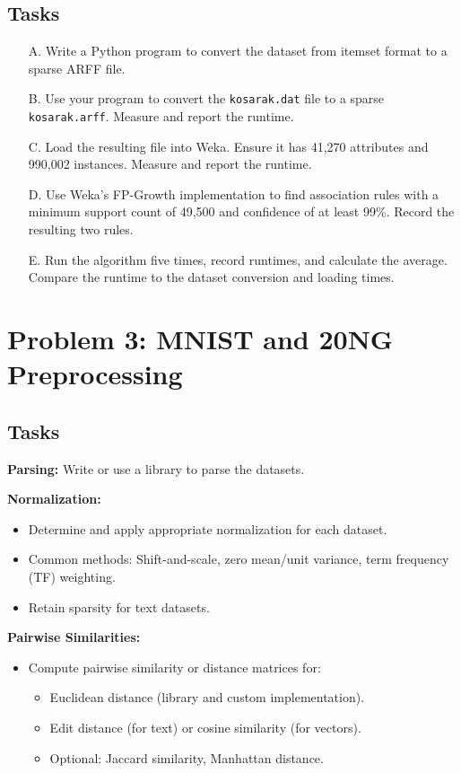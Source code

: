 \documentclass{article}
\begin{document}
\subsection*{Tasks}
\begin{enumerate}
    \item[A.] Write a Python program to convert the dataset from itemset format to a sparse ARFF file.
    \item[B.] Use your program to convert the \texttt{kosarak.dat} file to a sparse \texttt{kosarak.arff}. Measure and report the runtime.
    \item[C.] Load the resulting file into Weka. Ensure it has 41,270 attributes and 990,002 instances. Measure and report the runtime.
    \item[D.] Use Weka's FP-Growth implementation to find association rules with a minimum support count of 49,500 and confidence of at least 99\%. Record the resulting two rules.
    \item[E.] Run the algorithm five times, record runtimes, and calculate the average. Compare the runtime to the dataset conversion and loading times.
\end{enumerate}

\section*{Problem 3: MNIST and 20NG Preprocessing}
\subsection*{Tasks}
\textbf{Parsing:} Write or use a library to parse the datasets.

\textbf{Normalization:}
\begin{itemize}
    \item Determine and apply appropriate normalization for each dataset.
    \item Common methods: Shift-and-scale, zero mean/unit variance, term frequency (TF) weighting.
    \item Retain sparsity for text datasets.
\end{itemize}

\textbf{Pairwise Similarities:}
\begin{itemize}
    \item Compute pairwise similarity or distance matrices for:
    \begin{itemize}
        \item Euclidean distance (library and custom implementation).
        \item Edit distance (for text) or cosine similarity (for vectors).
        \item Optional: Jaccard similarity, Manhattan distance.
    \end{itemize}
\end{itemize}
\end{document}

